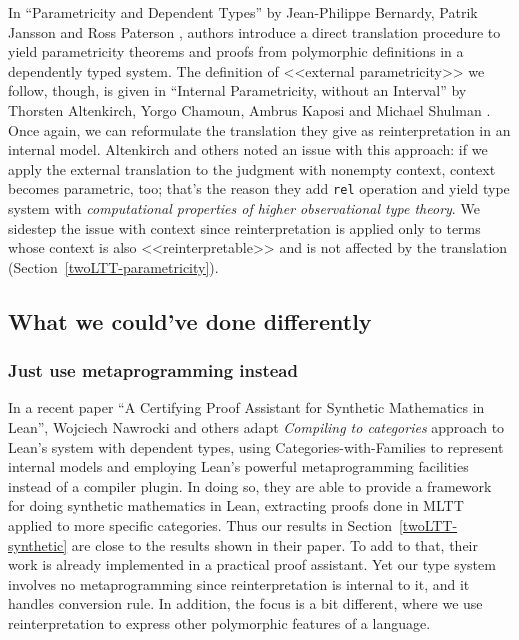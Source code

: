 In ``Parametricity and Dependent Types'' by
Jean-Philippe Bernardy, Patrik Jansson and Ross Paterson
\cite{Bernardy:Parametricity2010}, authors introduce a
direct translation procedure to yield parametricity
theorems and proofs from polymorphic definitions in a
dependently typed system. The definition of <<external
parametricity>> we follow, though, is given in
``Internal Parametricity, without an Interval'' by
Thorsten Altenkirch, Yorgo Chamoun, Ambrus Kaposi and
Michael Shulman \cite{Altenkirch:Parametricity2024}.
Once again, we can reformulate the translation they give
as reinterpretation in an internal model. Altenkirch and
others noted an issue with this approach: if we apply
the external translation to the judgment with nonempty
context, context becomes parametric, too; that's the
reason they add \texttt{rel} operation and yield type
system with \textit{computational properties of higher
observational type theory}. We sidestep the issue with
context since reinterpretation is applied only to terms
whose context is also <<reinterpretable>> and is not
affected by the translation
(Section~\ref{twoLTT-parametricity}).

\subsection{What we could've done differently}

\subsubsection{Just use metaprogramming instead}

In a recent paper ``A Certifying Proof Assistant for
Synthetic Mathematics in Lean'', Wojciech Nawrocki and
others \cite{Nawrocki:Lean2026} adapt \textit{Compiling
to categories} approach \cite{Elliott:Compcat2017} to
Lean's system with dependent types, using
Categories-with-Families to represent internal models
and employing Lean's powerful metaprogramming facilities
instead of a compiler plugin. In doing so, they are able
to provide a framework for doing synthetic mathematics
in Lean, extracting proofs done in MLTT applied to more
specific categories. Thus our results in
Section~\ref{twoLTT-synthetic} are close to the results shown in
their paper. To add to that, their work is already
implemented in a practical proof assistant. Yet our type
system involves no metaprogramming since
reinterpretation is internal to it, and it handles
conversion rule. In addition, the focus is a bit
different, where we use reinterpretation to express
other polymorphic features of a language.

